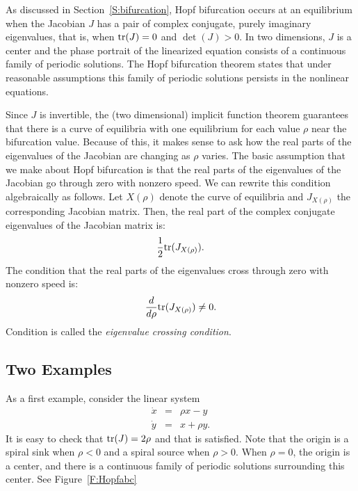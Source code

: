 \label{S:HopfBif}

As discussed in Section~\ref{S:bifurcation}, Hopf bifurcation occurs at
an equilibrium when the Jacobian $J$ has a pair of complex conjugate, purely 
imaginary eigenvalues, that is, when ${\rm tr}(J)=0$ and $\det(J)>0$.  In two 
dimensions, $J$ is a center and the phase portrait of the linearized equation 
consists of a continuous family of periodic solutions.  The Hopf bifurcation 
theorem states that under reasonable assumptions this family of periodic 
solutions persists in the nonlinear equations.   

Since $J$ is invertible, the (two dimensional) implicit function theorem 
guarantees that there is a curve of equilibria with one equilibrium for 
each value $\rho$ near the bifurcation value.  Because of this, it makes 
sense to ask how the real parts of the eigenvalues of the Jacobian are 
changing as $\rho$ varies.  The basic assumption that we make about Hopf 
bifurcation is that the real parts of the eigenvalues of the Jacobian go 
through zero with nonzero speed.  We can rewrite this condition algebraically 
as follows.  Let $X(\rho)$ denote the curve of equilibria and $J_{X(\rho)}$ 
the corresponding Jacobian matrix.  Then, the real part of the complex 
conjugate eigenvalues of the Jacobian matrix is: 
\[
\frac{1}{2}{\rm tr}(J_{X(\rho)}). 
\]
The condition that the real parts of the eigenvalues cross through 
zero with nonzero speed is:
\begin{equation}  \label{e:2dhopf}
\frac{d}{d\rho} {\rm tr}(J_{X(\rho)}) \neq 0.
\end{equation}
Condition  is called the {\em eigenvalue crossing condition\/}.


\subsection*{Two Examples}

As a first example, consider the linear system
\begin{equation*}  \label{e:Hopflin}
\begin{array}{rcl}
\dot{x} & = & \rho x - y \\
\dot{y} & = & x + \rho y.
\end{array}
\end{equation*}
It is easy to check that ${\rm tr}(J)=2\rho$ and that 
is satisfied.  Note that the origin is a spiral sink when $\rho<0$ 
and a spiral source when $\rho>0$.  When $\rho=0$, the origin is a
center, and there is a continuous family of periodic solutions
surrounding this center.  See Figure~\ref{F:Hopfabc}

